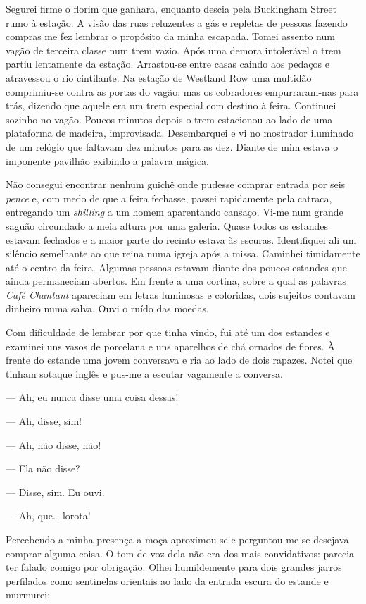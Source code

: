 Segurei firme o florim que ganhara, enquanto descia pela Buckingham Street rumo
à estação.  A visão das ruas reluzentes a gás e repletas de pessoas fazendo
compras me fez lembrar o propósito da minha escapada.  Tomei assento num vagão
de terceira classe num trem vazio.  Após uma demora intolerável o trem partiu
lentamente da estação.  Arrastou-se entre casas caindo aos pedaços e atravessou
o rio cintilante.  Na estação de Westland Row uma multidão comprimiu-se contra
as portas do vagão; mas os cobradores empurraram-nas para trás, dizendo que
aquele era um trem especial com destino à feira.  Continuei sozinho no vagão.
Poucos minutos depois o trem estacionou ao lado de uma plataforma de madeira,
improvisada.  Desembarquei e vi no mostrador iluminado de um relógio que
faltavam dez minutos para as dez.  Diante de mim estava o imponente pavilhão
exibindo a palavra mágica.

Não consegui encontrar nenhum guichê onde pudesse comprar entrada por seis
\textit{pence} e, com medo de que a feira fechasse, passei rapidamente pela
catraca, entregando um \textit{shilling} a um homem aparentando cansaço.  Vi-me
num grande saguão circundado a meia altura por uma galeria.  Quase todos os
estandes estavam fechados e a maior parte do recinto estava às escuras.
Identifiquei ali um silêncio semelhante ao que reina numa igreja após a missa.
Caminhei timidamente até o centro da feira.  Algumas pessoas estavam diante dos
poucos estandes que ainda permaneciam abertos.  Em frente a uma cortina, sobre
a qual as palavras \textit{Café Chantant} apareciam em letras luminosas e
coloridas, dois sujeitos contavam dinheiro numa salva.  Ouvi o ruído das
moedas.

Com dificuldade de lembrar por que tinha vindo, fui até um dos estandes e
examinei uns vasos de porcelana e uns aparelhos de chá ornados de flores.  À
frente do estande uma jovem conversava e ria ao lado de dois rapazes.  Notei
que tinham sotaque inglês e pus-me a escutar vagamente a conversa.

--- Ah, eu nunca disse uma coisa dessas!

--- Ah, disse, sim!

--- Ah, não disse, não!

--- Ela não disse?

--- Disse, sim.  Eu ouvi.

--- Ah, que\ldots{} lorota!

Percebendo a minha presença a moça aproximou-se e perguntou-me se desejava
comprar alguma coisa.  O tom de voz dela não era dos mais convidativos: parecia
ter falado comigo por obrigação.  Olhei humildemente para dois grandes jarros
perfilados como sentinelas orientais ao lado da entrada escura do estande e
murmurei:


